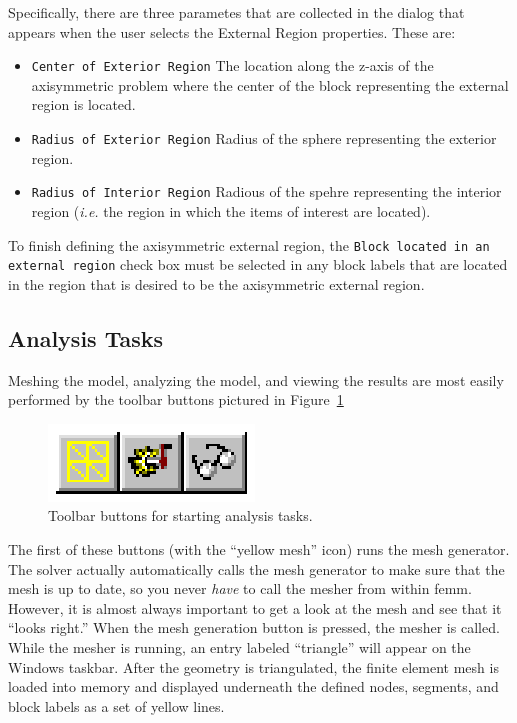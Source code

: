 \documentclass[12pt]{report}
\begin{document}
Specifically, there are three parametes that are collected in the dialog that appears when
the user selects the External Region properties.  These are:

\begin{itemize}
\item {\tt Center of Exterior Region}  The location along the z-axis of the axisymmetric problem
where the center of the block representing the external region is located.
\item {\tt Radius of Exterior Region}  Radius of the sphere representing the exterior region.
\item {\tt Radius of Interior Region} Radious of the spehre representing the interior region
({\em i.e.} the region in which the items of interest are located).
\end{itemize}

To finish defining the axisymmetric external region, the {\tt Block located in an external region}
check box must be selected in any block labels that are located in the region that is desired to
be the axisymmetric external region.

\subsection{Analysis Tasks}

Meshing the model, analyzing the model, and viewing the results are
most easily performed by the toolbar buttons pictured in
Figure~\ref{runnybutts}
\begin{figure}[ht]
\centerline{\includegraphics{spawnbtn.ps}}
\caption{Toolbar buttons for starting analysis tasks.}
\label{runnybutts}
\end{figure}

The first of these buttons (with the ``yellow mesh'' icon) runs the
mesh generator. The solver actually automatically calls the mesh
generator to make sure that the mesh is up to date, so you never
{\em have} to call the mesher from within femm.  However, it is
almost always important to get a look at the mesh and see that it
``looks right.''  When the mesh generation button is pressed, the
mesher is called.  While the mesher is running, an entry labeled
``triangle'' will appear on the Windows taskbar.
After the geometry is triangulated, the finite element mesh is
loaded into memory and displayed underneath the defined nodes,
segments, and block labels as a set of yellow lines.
\end{document}
